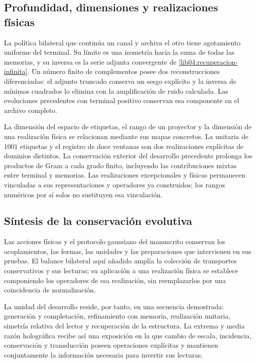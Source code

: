 \subsection{Profundidad, dimensiones y realizaciones físicas}
\label{lib06:profundidad}

La política bilateral que continúa un canal y archiva el otro
tiene agotamiento uniforme del terminal. Su límite es una
isometría hacia la suma de todas las memorias, y su inversa es
la serie adjunta convergente de
\eqref{lib04:recuperacion-infinita}. Un número finito de
complementos posee dos reconstrucciones diferenciadas: el
adjunto truncado conserva un sesgo explícito y la inversa de
mínimos cuadrados lo elimina con la amplificación de ruido
calculada. Las evoluciones precedentes con terminal positivo
conservan esa componente en el archivo completo.

La dimensión del espacio de etiquetas, el rango de un proyector y
la dimensión de una realización física se relacionan mediante
sus mapas concretos. La unitaria de \(1001\) etiquetas y el
registro de doce ventanas son dos realizaciones explícitas de
dominios distintos. La conservación exterior del desarrollo
precedente prolonga los productos de Gram a cada grado finito,
incluyendo las contribuciones mixtas entre terminal y memorias.
Las realizaciones excepcionales y físicas permanecen vinculadas
a sus representaciones y operadores ya construidos; los rangos
numéricos por sí solos no sustituyen esa vinculación.

\subsection{Síntesis de la conservación evolutiva}
Las acciones físicas y el protocolo gaussiano del manuscrito
conservan los acoplamientos, las formas, las unidades y las
preparaciones que intervienen en sus pruebas. El balance
bilateral aquí añadido amplía la colección de transportes
conservativos y sus lecturas; su aplicación a una realización
física se establece componiendo los operadores de esa
realización, sin reemplazarlos por una coincidencia de
normalización.

La unidad del desarrollo reside, por tanto, en una secuencia
demostrada: generación y completación, refinamiento con memoria,
realización unitaria, simetría relativa del lector y recuperación
de la estructura. La extrema y media razón holográfica recibe
así una exposición en la que cambio de escala, incidencia,
conservación y transducción poseen operaciones explícitas y
mantienen conjuntamente la información necesaria para invertir
sus lecturas.
